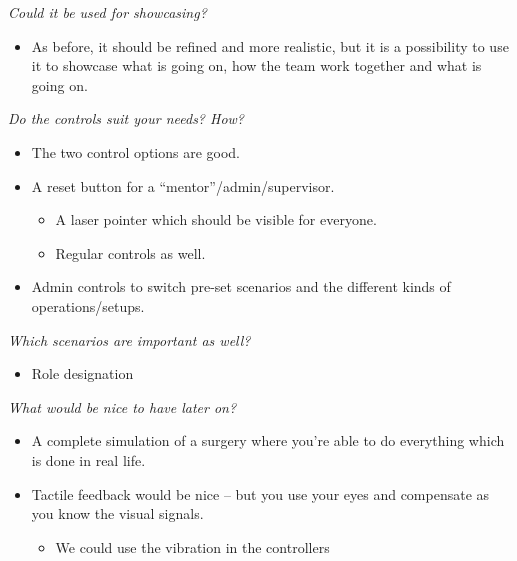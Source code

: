 \textit{Could it be used for showcasing?}
\begin{itemize}
	\item As before, it should be refined and more realistic, but it is a possibility to use it to showcase what is going on, how the team work together and what is going on.
\end{itemize}

\textit{Do the controls suit your needs? How?}
\begin{itemize}
	\item The two control options are good.
	\item A reset button for a “mentor”/admin/supervisor. 
	\begin{itemize}
		\item A laser pointer which should be visible for everyone. 
		\item Regular controls as well.
	\end{itemize}
	\item Admin controls to switch pre-set scenarios and the different kinds of operations/setups.
\end{itemize}

\textit{Which scenarios are important as well?}
\begin{itemize}
	\item Role designation
\end{itemize}

\textit{What would be nice to have later on?}
\begin{itemize}
	\item A complete simulation of a surgery where you’re able to do everything which is done in real life.
	\item Tactile feedback would be nice – but you use your eyes and compensate as you know the visual signals.
	\begin{itemize}
		\item We could use the vibration in the controllers
	\end{itemize}
	
\end{itemize}